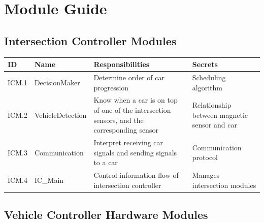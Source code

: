 \documentclass [10pt]{article}
\begin{document}


\section{Module Guide}


\subsection{Intersection Controller Modules}

\begin{longtable}{ |p{ }  | p{ } |  p{ } |  p{ } |}  \hline
    
    \textbf{ID} & \textbf{Name} &  \textbf{Responsibilities} & \textbf{Secrets} \\ \hline
    
    \cellcolor{tableCell}ICM.1  & \cellcolor{tableCell}DecisionMaker & \cellcolor{tableCell}Determine order of car progression & \cellcolor{tableCell} Scheduling algorithm \\ \hline
    
    ICM.2 & VehicleDetection & Know when a car is on top of one of the intersection sensors, and the corresponding sensor & Relationship between magnetic sensor and car \\ \hline
    
    \cellcolor{tableCell}ICM.3  & \cellcolor{tableCell}Communication & \cellcolor{tableCell}Interpret receiving car signals and sending signals to a car & \cellcolor{tableCell}Communication protocol \\ \hline
    
    
        ICM.4 & IC\_Main & Control information flow of intersection controller & Manages intersection modules \\ \hline

\end{longtable}






\subsection{Vehicle Controller Hardware Modules}
\end{document}
